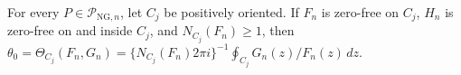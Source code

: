 For every \(P\in\mathcal P_{\mathrm{NG},n}\), let \(C_j\) be positively oriented. If \(F_n\) is zero-free on \(C_j\), \(H_n\) is zero-free on and inside \(C_j\), and \(N_{C_j}(F_n)\ge1\), then \(\theta_0=\Theta_{C_j}(F_n,G_n)=\{N_{C_j}(F_n)2\pi i\}^{-1}\oint_{C_j}G_n(z)/F_n(z)\,dz\).